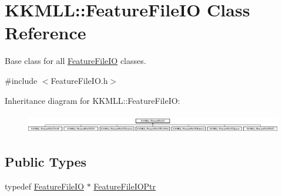 \hypertarget{class_k_k_m_l_l_1_1_feature_file_i_o}{}\section{K\+K\+M\+LL\+:\+:Feature\+File\+IO Class Reference}
\label{class_k_k_m_l_l_1_1_feature_file_i_o}


Base class for all \hyperlink{class_k_k_m_l_l_1_1_feature_file_i_o}{Feature\+File\+IO} classes.  




{\ttfamily \#include $<$Feature\+File\+I\+O.\+h$>$}

Inheritance diagram for K\+K\+M\+LL\+:\+:Feature\+File\+IO\+:\begin{figure}[H]
\begin{center}
\leavevmode
\includegraphics[height=0.851064cm]{class_k_k_m_l_l_1_1_feature_file_i_o}
\end{center}
\end{figure}
\subsection*{Public Types}
\begin{DoxyCompactItemize}
\item 
typedef \hyperlink{class_k_k_m_l_l_1_1_feature_file_i_o}{Feature\+File\+IO} $\ast$ \hyperlink{class_k_k_m_l_l_1_1_feature_file_i_o_a12e6dd6bcaf2576238622568d92f981f}{Feature\+File\+I\+O\+Ptr}
\end{DoxyCompactItemize}
